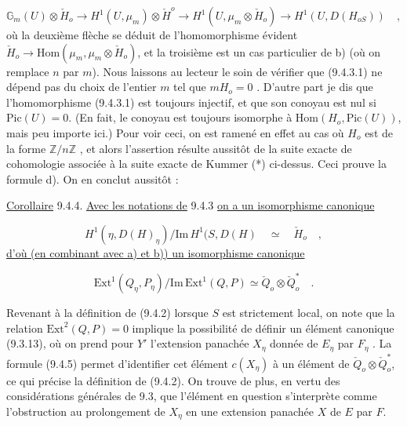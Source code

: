 \begin{equation*}
\mathbb{G}_m(U) \otimes \check{H}_o \longrightarrow H^1(U ,\mu_m) \otimes \check{H}^o \longrightarrow H^1(U,\mu_m \otimes \check{H}_o) \longrightarrow H^1(U, D(H_{oS})) \quad ,
\end{equation*}
où la deuxième flèche se déduit de l'homomorphisme évident $\check{H}_o \longrightarrow \mathrm{Hom}(\mu_m, \mu_m \otimes \check{H}_o)$, et la troisième est un cas particulier de b) (où on remplace $n$ par $m$). Nous laissons au lecteur le soin de vérifier que (9.4.3.1) ne dépend pas du choix de l'entier $m$ tel que $mH_o = 0$ . D'autre part je dis que l'homomorphisme (9.4.3.1) est toujours injectif, et que son conoyau est nul si $\mathrm{Pic}(U) = 0$. (En fait, le conoyau est toujours isomorphe à $\mathrm{Hom}(H_o,\mathrm{Pic}(U))$, mais peu importe ici.) Pour voir ceci, on est ramené en effet au cas où $H_o$ est de la forme $\mathbb{Z}/n\mathbb{Z}$ , et alors l'assertion résulte aussitôt de la suite exacte de cohomologie associée à la suite exacte de Kummer (*) ci-dessus. Ceci prouve la formule d). On en conclut aussitôt :

\underline{Corollaire} 9.4.4. \underline{Avec les notations de} 9.4.3 \underline{on a un isomorphisme canonique}

\begin{equation*}
H^1(\eta,D(H)_\eta)/ \mathrm{Im}\, H^1(S,D(H) \quad \simeq \quad \check{H}_o \quad ,
\end{equation*}
\underline{d'où (en combinant avec a) et b)) un isomorphisme canonique}

\begin{equation}\tag{9.4.5}
\mathrm{Ext}^1(Q_\eta,P_\eta)/\mathrm{Im}\, \mathrm{Ext}^1(Q,P) \simeq \check{Q}_o \otimes \check{Q}_o^* \quad .
\end{equation}


Revenant à la définition de (9.4.2) lorsque $S$ est strictement local, on note que la relation $\mathrm{Ext}^2(Q,P) = 0$ implique la possibilité de définir un élément canonique (9.3.13), où on prend pour $Y'$ l'extension panachée $X_\eta$ donnée de $E_\eta$ par $F_\eta$ . La formule (9.4.5) permet d'identifier cet élément $c(X_\eta)$ à un élément de $\check{Q}_o \otimes \check{Q}_o^*$, ce qui précise la définition de (9.4.2). On trouve de plus, en vertu des considérations générales de 9.3, que l'élément en question s'interprète comme l'obstruction au prolongement de $X_\eta$ en une extension panachée $X$ de $E$ par $F$.

